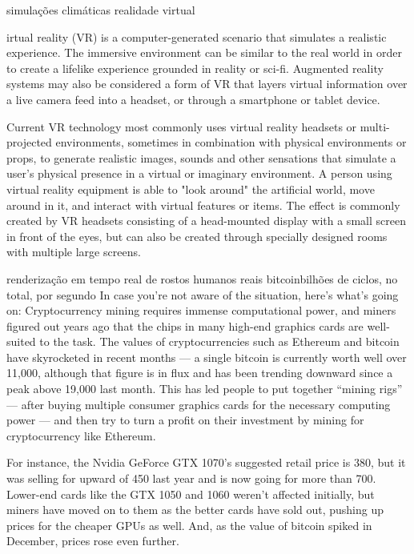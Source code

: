 simulações climáticas
realidade virtual

irtual reality (VR) is a computer-generated scenario that simulates a realistic experience. The immersive environment can be similar to the real world in order to create a lifelike experience grounded in reality or sci-fi. Augmented reality systems may also be considered a form of VR that layers virtual information over a live camera feed into a headset, or through a smartphone or tablet device.

Current VR technology most commonly uses virtual reality headsets or multi-projected environments, sometimes in combination with physical environments or props, to generate realistic images, sounds and other sensations that simulate a user's physical presence in a virtual or imaginary environment. A person using virtual reality equipment is able to "look around" the artificial world, move around in it, and interact with virtual features or items. The effect is commonly created by VR headsets consisting of a head-mounted display with a small screen in front of the eyes, but can also be created through specially designed rooms with multiple large screens.

renderização em tempo real de rostos humanos reais
bitcoinbilhões de ciclos, no total, por segundo
In case you’re not aware of the situation, here’s what’s going on: Cryptocurrency mining requires immense computational power, and miners figured out years ago that the chips in many high-end graphics cards are well-suited to the task. The values of cryptocurrencies such as Ethereum and bitcoin have skyrocketed in recent months — a single bitcoin is currently worth well over 11,000, although that figure is in flux and has been trending downward since a peak above 19,000 last month. This has led people to put together “mining rigs” — after buying multiple consumer graphics cards for the necessary computing power — and then try to turn a profit on their investment by mining for cryptocurrency like Ethereum.

For instance, the Nvidia GeForce GTX 1070’s suggested retail price is 380, but it was selling for upward of 450 last year and is now going for more than 700. Lower-end cards like the GTX 1050 and 1060 weren’t affected initially, but miners have moved on to them as the better cards have sold out, pushing up prices for the cheaper GPUs as well. And, as the value of bitcoin spiked in December, prices rose even further.
